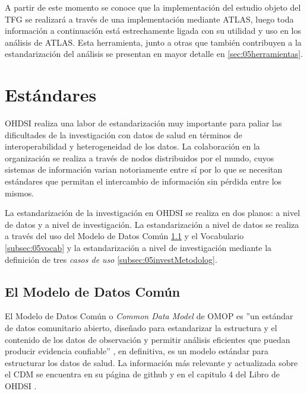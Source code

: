 A partir de este momento se conoce que la implementación del estudio objeto del TFG se realizará a través de una implementación mediante ATLAS, luego toda información a continuación está estrechamente ligada con su utilidad y uso en los análisis de ATLAS. Esta herramienta, junto a otras que también contribuyen a la estandarización del análisis se presentan en mayor detalle en \ref{sec:05herramientas}.

\section{Estándares}\label{sec:05estandares}


OHDSI realiza una labor de estandarización muy importante para paliar las dificultades de la investigación con datos de salud en términos de interoperabilidad y heterogeneidad de los datos. La colaboración en la organización se realiza a través de nodos distribuidos por el mundo, cuyos sistemas de información varian notoriamente entre sí por lo que se necesitan estándares que permitan el intercambio de información sin pérdida entre los mismos.

La estandarización de la investigación en OHDSI se realiza en dos planos: a nivel de datos y a nivel de investigación. La estandarización a nivel de datos se realiza a través del uso del Modelo de Datos Común \ref{subsec:05cdm} y el Vocabulario \ref{subsec:05vocab} y la estandarización a nivel de investigación mediante la definición de tres \textit{casos de uso} \ref{subsec:05investMetodolog}.

\subsection{El Modelo de Datos Común} \label{subsec:05cdm}

El Modelo de Datos Común o \textit{Common Data Model} de OMOP es ''un estándar de datos comunitario abierto, diseñado para estandarizar la estructura y el contenido de los datos de observación y permitir análisis eficientes que puedan producir evidencia confiable'' \cite{gitPagesCMD}, en definitiva, es un modelo estándar para estructurar los datos de salud. La información más relevante y actualizada sobre el CDM se encuentra en su página de github \cite{gitPagesCMD} y en el capitulo 4 del Libro de OHDSI \cite{OHDSIbook}.

